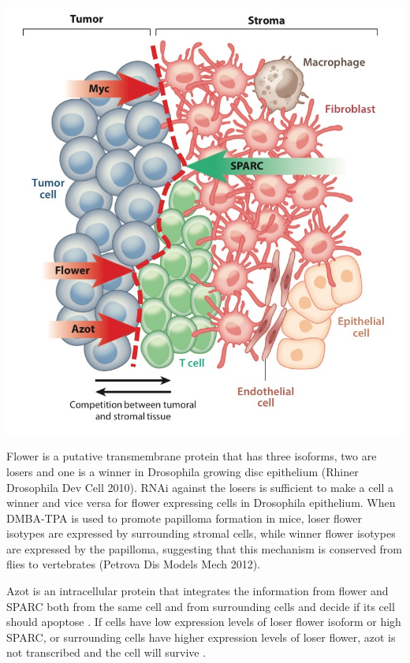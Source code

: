 \documentclass[]{book}
\newenvironment{Shaded}{\begin{snugshade}}{\end{snugshade}}
\newcommand{\DataTypeTok}[1]{\textcolor[rgb]{0.13,0.29,0.53}{#1}}
\newcommand{\DecValTok}[1]{\textcolor[rgb]{0.00,0.00,0.81}{#1}}
\newcommand{\KeywordTok}[1]{\textcolor[rgb]{0.13,0.29,0.53}{\textbf{#1}}}
\newcommand{\NormalTok}[1]{#1}
\newcommand{\OperatorTok}[1]{\textcolor[rgb]{0.81,0.36,0.00}{\textbf{#1}}}
\newcommand{\OtherTok}[1]{\textcolor[rgb]{0.56,0.35,0.01}{#1}}
\begin{document}
\includegraphics{images/04-1.jpg}

\begin{Shaded}
\end{Shaded}

Flower is a putative transmembrane protein that has three isoforms, two are losers and one is a winner in Drosophila growing disc epithelium (Rhiner Drosophila Dev Cell 2010). RNAi against the losers is sufficient to make a cell a winner and vice versa for flower expressing cells in Drosophila epithelium. When DMBA-TPA is used to promote papilloma formation in mice, loser flower isotypes are expressed by surrounding stromal cells, while winner flower isotypes are expressed by the papilloma, suggesting that this mechanism is conserved from flies to vertebrates (Petrova Dis Models Mech 2012).

Azot is an intracellular protein that integrates the information from flower and SPARC both from the same cell and from surrounding cells and decide if its cell should apoptose \citep{petrova2011expression}. If cells have low expression levels of loser flower isoform or high SPARC, or surrounding cells have higher expression levels of loser flower, azot is not transcribed and the cell will survive \citep{merino2015elimination}.
\end{document}
